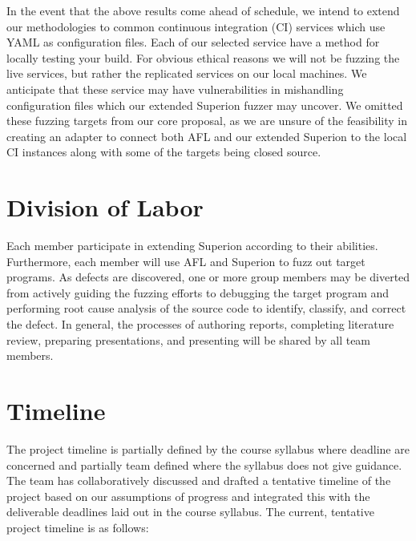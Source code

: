 \documentclass[12pt]{diazessay}
\begin{document}
In the event that the above results come ahead of schedule, we intend to extend our methodologies to common continuous integration (CI) services which use YAML as configuration files.
Each of our selected service have a method for locally testing your build.
For obvious ethical reasons we will not be fuzzing the live services, but rather the replicated services on our local machines.
We anticipate that these service may have vulnerabilities in mishandling configuration files which our extended Superion fuzzer may uncover.
We omitted these fuzzing targets from our core proposal, as we are unsure of the feasibility in creating an adapter to connect both AFL and our extended Superion to the local CI instances along with some of the targets being closed source.


\section*{Division of Labor}

Each member participate in extending Superion according to their abilities.
Furthermore, each member will use AFL and Superion to fuzz out target programs.
As defects are discovered, one or more group members may be diverted from actively guiding the fuzzing efforts to debugging the target program and performing root cause analysis of the source code to identify, classify, and correct the defect.
In general, the processes of authoring reports, completing literature review, preparing presentations, and presenting will be shared by all team members.


\section*{Timeline}

The project timeline is partially defined by the course syllabus where deadline are concerned and partially team defined where the syllabus does not give guidance.
The team has collaboratively discussed and drafted a tentative timeline of the project based on our assumptions of progress and integrated this with the deliverable deadlines laid out in the course syllabus. The current, tentative project timeline is as follows:
\end{document}
